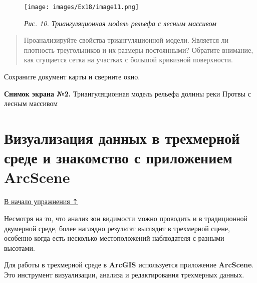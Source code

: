 \documentclass[12pt,]{book}
\begin{document}
\begin{enumerate}
  \begin{figure}
  \centering
  \texttt{[image: images/Ex18/image11.png]}
  \caption{\emph{Рис. 10. Триангуляционная модель рельефа с лесным массивом}}
  \end{figure}
\end{enumerate}

\begin{quote}
Проанализируйте свойства триангуляционной модели. Является ли плотность треугольников и их размеры постоянными? Обратите внимание, как сгущается сетка на участках с большой кривизной поверхности.
\end{quote}

Сохраните документ карты и сверните окно.

\textbf{Снимок экрана №2.} Триангуляционная модель рельефа долины реки Протвы с лесным массивом

\hypertarget{threed-modelling-arcscene}{%
\section{Визуализация данных в трехмерной среде и знакомство с приложением ArcScene}\label{threed-modelling-arcscene}}

\protect\hyperlink{threed-modelling}{В начало упражнения ⇡}

Несмотря на то, что анализ зон видимости можно проводить и в традиционной двумерной среде, более наглядно результат выглядит в трехмерной сцене, особенно когда есть несколько местоположений наблюдателя с разными высотами.

Для работы в трехмерной среде в \textbf{ArcGIS} используется приложение \textbf{ArcScene}. Это инструмент визуализации, анализа и редактирования трехмерных данных.
\end{document}
